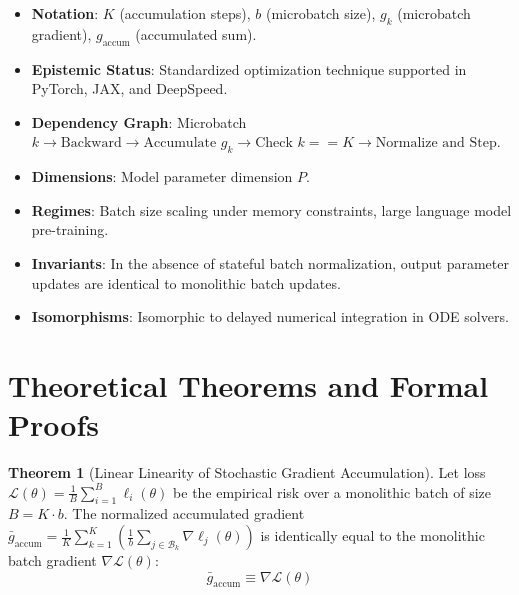 \documentclass[11pt,a4paper]{article}
\theoremstyle{definition}
\newtheorem{theorem}{\textbf{Theorem}}[section]
\begin{document}
\begin{itemize}
    \item \textbf{Notation}: $K$ (accumulation steps), $b$ (microbatch size), $g_k$ (microbatch gradient), $g_{\text{accum}}$ (accumulated sum).
    \item \textbf{Epistemic Status}: Standardized optimization technique supported in PyTorch, JAX, and DeepSpeed.
    \item \textbf{Dependency Graph}: Microbatch $k \to \text{Backward} \to \text{Accumulate } g_k \to \text{Check } k == K \to \text{Normalize and Step}$.
    \item \textbf{Dimensions}: Model parameter dimension $P$.
    \item \textbf{Regimes}: Batch size scaling under memory constraints, large language model pre-training.
    \item \textbf{Invariants}: In the absence of stateful batch normalization, output parameter updates are identical to monolithic batch updates.
    \item \textbf{Isomorphisms}: Isomorphic to delayed numerical integration in ODE solvers.
\end{itemize}

\section{Theoretical Theorems and Formal Proofs}

\begin{theorem}[Linear Linearity of Stochastic Gradient Accumulation]
Let loss $\mathcal{L}(\theta) = \frac{1}{B} \sum_{i=1}^B \ell_i(\theta)$ be the empirical risk over a monolithic batch of size $B = K \cdot b$. The normalized accumulated gradient $\bar{g}_{\text{accum}} = \frac{1}{K} \sum_{k=1}^K \left( \frac{1}{b} \sum_{j \in \mathcal{B}_k} \nabla \ell_j(\theta) \right)$ is identically equal to the monolithic batch gradient $\nabla \mathcal{L}(\theta)$:
{\boldmath
\begin{equation}
\bar{g}_{\text{accum}} \equiv \nabla \mathcal{L}(\theta)
\end{equation}
}
\end{theorem}
\end{document}
